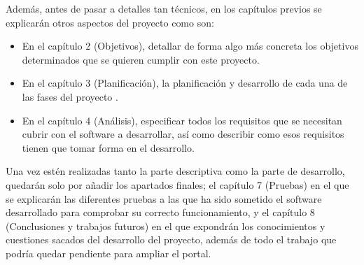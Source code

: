 \bigskip
Además, antes de pasar a detalles tan técnicos, en los capítulos previos se explicarán otros aspectos del proyecto como son:

\begin{itemize}
  \item En el capítulo 2 (Objetivos), detallar de forma algo más concreta los objetivos determinados que se quieren cumplir con este 
proyecto.
  \item En el capítulo 3 (Planificación), la planificación y desarrollo de cada una de las fases del proyecto .
  \item En el capítulo 4 (Análisis), especificar todos los requisitos que se necesitan cubrir con el software a desarrollar, así como
describir como esos requisitos tienen que tomar forma en el desarrollo.
\end{itemize}

\bigskip
Una vez estén realizadas tanto la parte descriptiva como la parte de desarrollo, quedarán solo por añadir los apartados finales;
el capítulo 7 (Pruebas) en el que se explicarán las diferentes pruebas a las que ha sido sometido el software desarrollado para
comprobar su correcto funcionamiento, y el capítulo 8 (Conclusiones y trabajos futuros) en el que expondrán los conocimientos y
cuestiones sacados del desarrollo del proyecto, además de todo el trabajo que podría quedar pendiente para ampliar el portal.

